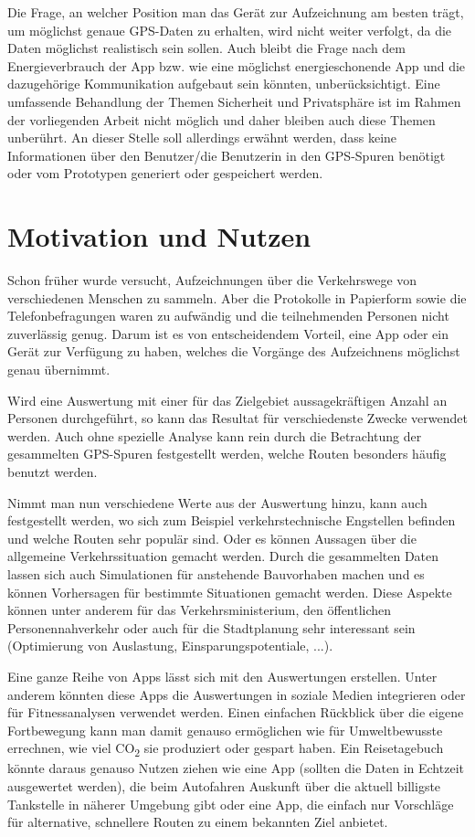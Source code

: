 Die Frage, an welcher Position man das Gerät zur Aufzeichnung am besten trägt, um möglichst genaue GPS-Daten zu erhalten, wird nicht weiter verfolgt, da die Daten möglichst realistisch sein sollen. Auch bleibt die Frage nach dem Energieverbrauch der App bzw. wie eine möglichst energieschonende App und die dazugehörige Kommunikation aufgebaut sein könnten, unberücksichtigt. Eine umfassende Behandlung der Themen Sicherheit und Privatsphäre ist im Rahmen der vorliegenden Arbeit nicht möglich und daher bleiben auch diese Themen unberührt. An dieser Stelle soll allerdings erwähnt werden, dass keine Informationen über den Benutzer/die Benutzerin in den GPS-Spuren benötigt oder vom Prototypen generiert oder gespeichert werden.

\section{Motivation und Nutzen}
Schon früher wurde versucht, Aufzeichnungen über die Verkehrswege von verschiedenen Menschen zu sammeln. Aber die Protokolle in Papierform sowie die Telefonbefragungen waren zu aufwändig und die teilnehmenden Personen nicht zuverlässig genug. Darum ist es von entscheidendem Vorteil, eine App oder ein Gerät zur Verfügung zu haben, welches die Vorgänge des Aufzeichnens möglichst genau  übernimmt. \cite{zheng_understanding_2010}

Wird eine Auswertung mit einer für das Zielgebiet aussagekräftigen Anzahl an Personen durchgeführt, so kann das Resultat  für verschiedenste Zwecke verwendet werden. Auch ohne spezielle Analyse kann rein durch die Betrachtung der gesammelten GPS-Spuren festgestellt werden, welche Routen besonders häufig benutzt werden.

Nimmt man nun verschiedene Werte aus der Auswertung hinzu, kann auch festgestellt werden, wo sich zum Beispiel verkehrstechnische Engstellen befinden und welche Routen sehr populär sind. Oder es können Aussagen über die allgemeine Verkehrssituation gemacht werden. Durch die gesammelten Daten lassen sich auch Simulationen für anstehende Bauvorhaben machen und es können Vorhersagen für bestimmte Situationen gemacht werden. Diese Aspekte können unter anderem für das Verkehrsministerium,  den öffentlichen Personennahverkehr oder auch für die Stadtplanung sehr interessant sein (Optimierung von Auslastung, Einsparungspotentiale, ...).

Eine ganze Reihe von Apps lässt sich mit den Auswertungen erstellen. Unter anderem könnten diese Apps die Auswertungen in soziale Medien integrieren oder für Fitnessanalysen verwendet werden. Einen einfachen Rückblick über die eigene Fortbewegung kann man damit genauso ermöglichen wie für Umweltbewusste errechnen, wie viel CO\textsubscript{2} sie produziert oder gespart haben. Ein Reisetagebuch könnte daraus genauso Nutzen ziehen wie eine App (sollten die Daten in Echtzeit ausgewertet werden), die beim Autofahren Auskunft über die aktuell billigste Tankstelle in näherer Umgebung gibt oder eine App, die einfach nur Vorschläge für alternative, schnellere Routen zu einem bekannten Ziel anbietet.

